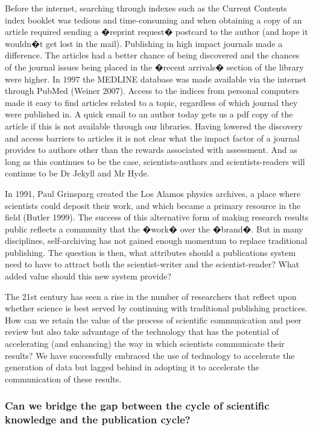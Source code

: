 \documentclass[final,authoryear,3p]{elsarticle-open-drafting}
\begin{document}
Before the internet, searching through indexes such as the Current Contents index booklet was tedious and time-consuming and 
when obtaining a copy of an article required sending a �reprint request� postcard to the author (and hope it wouldn�t get lost in the 
mail). Publishing in high impact journals made a difference. The articles had a better chance of being discovered and the 
chances of the journal issues being placed in the �recent arrivals� section of the library were higher. In 1997 the MEDLINE 
database was made available via the internet through PubMed (Weiner 2007). Access to the indices from personal computers 
made it easy to find articles related to a topic, regardless of which journal they were published in. A quick email to an author 
today gets us a pdf copy of the article if this is not available through our libraries. Having lowered the discovery and access 
barriers to articles it is not clear what the impact factor of a journal provides to authors other than the rewards associated with 
assessment. And as long as this continues to be the case, scientists-authors and scientists-readers will continue to be Dr Jekyll 
and Mr Hyde.

In 1991, Paul Grinsparg created the Los Alamos physics archives, a place where scientists could deposit their work, and which 
became a primary resource in the field (Butler 1999). The success of this alternative form of making research results public  
reflects a community that the �work� over the �brand�. But in many disciplines, self-archiving has not gained enough momentum to 
replace traditional publishing. The question is then, what attributes should a publications system need to have to attract both the 
scientist-writer and the scientist-reader? What added value should this new system provide?

The 21st century has seen a rise in the number of researchers that reflect upon whether science is best served by continuing with 
traditional publishing practices. How can we retain the value of the process of scientific communication and peer review but also 
take advantage of the technology that has the potential of accelerating (and enhancing) the way in which scientists communicate 
their results? We have successfully embraced the use of technology to accelerate the generation of data but lagged behind in 
adopting it to accelerate the communication of these results.

\subsubsection[Can we bridge the gap?]{Can we bridge the gap between the cycle of scientific knowledge and the publication cycle?}
\end{document}
